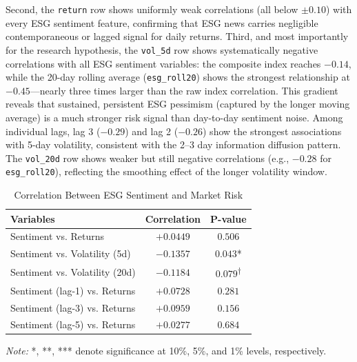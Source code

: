 \documentclass[12pt,a4paper]{article}
\begin{document}
Second, the \texttt{return} row shows uniformly weak correlations (all below $\pm 0.10$) with every ESG sentiment feature, confirming that ESG news carries negligible contemporaneous or lagged signal for daily returns. Third, and most importantly for the research hypothesis, the \texttt{vol\_5d} row shows systematically negative correlations with all ESG sentiment variables: the composite index reaches $-0.14$, while the 20-day rolling average (\texttt{esg\_roll20}) shows the strongest relationship at $-0.45$---nearly three times larger than the raw index correlation. This gradient reveals that sustained, persistent ESG pessimism (captured by the longer moving average) is a much stronger risk signal than day-to-day sentiment noise. Among individual lags, lag 3 ($-0.29$) and lag 2 ($-0.26$) show the strongest associations with 5-day volatility, consistent with the 2--3 day information diffusion pattern. The \texttt{vol\_20d} row shows weaker but still negative correlations (e.g., $-0.28$ for \texttt{esg\_roll20}), reflecting the smoothing effect of the longer volatility window.

\begin{table}[H]
    \centering
    \caption{Correlation Between ESG Sentiment and Market Risk}
    \label{tab:correlations}
    \begin{tabular}{lcc}
        \toprule
        \textbf{Variables} & \textbf{Correlation} & \textbf{P-value} \\
        \midrule
        Sentiment vs. Returns & $+0.0449$ & $0.506$ \\
        Sentiment vs. Volatility (5d) & $-0.1357$ & $0.043$* \\
        Sentiment vs. Volatility (20d) & $-0.1184$ & $0.079$\textsuperscript{†} \\
        \midrule
        Sentiment (lag-1) vs. Returns & $+0.0728$ & $0.281$ \\
        Sentiment (lag-3) vs. Returns & $+0.0959$ & $0.156$ \\
        Sentiment (lag-5) vs. Returns & $+0.0277$ & $0.684$ \\
        \bottomrule
    \end{tabular}
    \vspace{0.3cm}
    
    \small{\textit{Note:} *, **, *** denote significance at 10\%, 5\%, and 1\% levels, respectively.}
\end{table}

\end{document}
